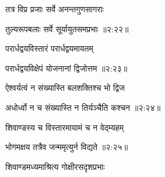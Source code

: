 {\devanagarifont तत्र विप्र प्रजाः सर्वे अनन्तगुणसागराः \thinspace{\dandab} \dontdisplaylinenum }%
 

{\devanagarifont तुल्यरूपबलाः सर्वे सूर्यायुतसमप्रभाः {॥२:२२॥} \veg\dontdisplaylinenum }%

{\devanagarifont परार्धद्वयविस्तारं परार्धद्वयमायतम् \thinspace{\dandab} \dontdisplaylinenum }%
 

{\devanagarifont परार्धद्वयविक्षेपं योजनानां द्विजोत्तम {॥२:२३॥} \veg\dontdisplaylinenum }%

{\devanagarifont ऐश्वर्यत्वं न संख्यास्ति बलशक्तिश्च भो द्विज \thinspace{\dandab} \dontdisplaylinenum }%


{\devanagarifont अधोर्ध्वो न च संख्यास्ति न तिर्यञ्चैति कश्चन {॥२:२४॥} \veg\dontdisplaylinenum }%

{\devanagarifont शिवाण्डस्य च विस्तारमायामं च न वेद्म्यहम् \thinspace{\dandab} \dontdisplaylinenum }%
 

{\devanagarifont भोगमक्षय तत्रैव जन्ममृत्युर्न विद्यते {॥२:२५॥} \veg\dontdisplaylinenum }%

{\devanagarifont शिवाण्डमध्यमाश्रित्य गोक्षीरसदृशप्रभाः \thinspace{\dandab} \dontdisplaylinenum }%


